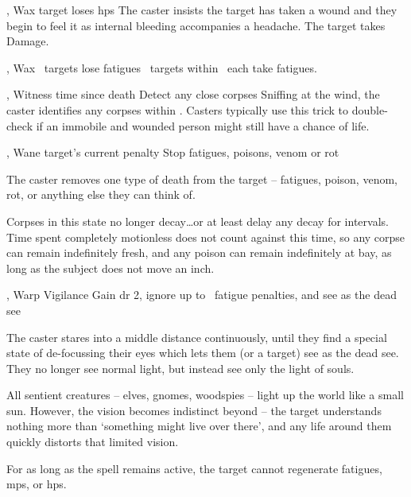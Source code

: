   {\mFate, \mAir}%
  {Wax}%
  {\detailed}%
  {}%
  {target loses  \glspl{hp}}%
  {
    The caster insists the target has taken a wound and they begin to feel it as internal bleeding accompanies a headache.
    The target takes  Damage.
  }

  {\mFate, \mAir}%
  {Wax}%
  {\duplicated}%
  {}%
  {\spellArea\ targets lose  \glspl{fatigue}}%
  {
    \spellArea\ targets within \spellRange\ each take  \glspl{fatigue}.
  }

  {\mFate, \mAir}%
  {Witness}%
  {\distant}%
  {time since death}%
  {Detect any close corpses}%
  {
    Sniffing at the wind, the caster identifies any corpses within \spellRange.
    Casters typically use this trick to double-check if an immobile and wounded person might still have a chance of life.
  }

  {\mFate, \mAir}%
  {Wane}%
  {\detailed}%
  {target's current  penalty}%
  {Stop \glspl{fatigue}, poisons, venom or rot}%
  {
    The caster removes one type of death from the target -- \glspl{fatigue}, poison, venom, rot, or anything else they can think of.

    Corpses in this state no longer decay\ldots or at least delay any decay for  \glspl{interval}. 
    Time spent completely motionless does not count against this time, so any corpse can remain indefinitely fresh, and any poison can remain indefinitely at bay, as long as the subject does not move an inch.
  }

  {\mFate, \mAir}%
  {Warp}%
  {\detailed}%
  {Vigilance}%
  {Gain \gls{dr} 2, ignore up to ~\gls{fatigue} penalties, and see as the dead see}%
  {
    The caster stares into a middle distance continuously, until they find a special state of de-focussing their eyes which lets them (or a target) see as the dead see.
    They no longer see normal light, but instead see only the light of souls.

    All sentient creatures -- elves, gnomes, woodspies -- light up the world like a small sun.
    However, the vision becomes indistinct beyond \spellRange -- the target understands nothing more than `something might live over there', and any life around them quickly distorts that limited vision.

    For as long as the spell remains active, the target cannot regenerate \glspl{fatigue}, \glspl{mp}, or \glspl{hp}.
  }

